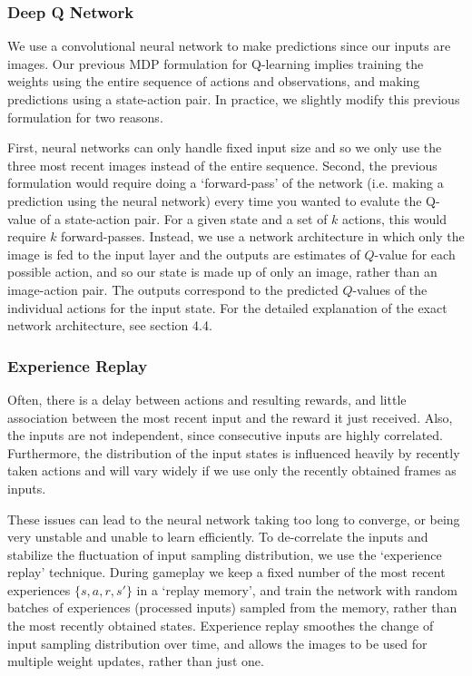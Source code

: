 \documentclass{article}
\begin{document}
\begin{multicols}{2}
\subsubsection{Deep Q Network}

We use a convolutional neural network to make predictions since our inputs are images. Our previous MDP formulation for Q-learning implies training the weights using the entire sequence of actions and observations, and making predictions using a state-action pair. In practice, we slightly modify this previous formulation for two reasons.

First, neural networks can only handle fixed input size and so we only use the three most recent images instead of the entire sequence.
Second, the previous formulation would require doing a `forward-pass' of the network (i.e. making a prediction using the neural network) every time you wanted to evalute the Q-value of a state-action pair. For a given state and a set of $k$ actions, this would require $k$ forward-passes.
Instead, we use a network architecture in which only the image is fed to the input layer and the outputs are estimates of $Q$-value for each possible action, and so our state is made up of only an image, rather than an image-action pair. The outputs correspond to the predicted $Q$-values of the individual actions for the input state. For the detailed explanation of the exact network architecture, see section 4.4.

\subsubsection{Experience Replay}

Often, there is a delay between actions and resulting rewards, and little association between the most recent input and the reward it just received. Also, the inputs are not independent, since consecutive inputs are highly correlated. Furthermore, the distribution of the input states is influenced heavily by recently taken actions and will vary widely if we use only the recently obtained frames as inputs.

These issues can lead to the neural network taking too long to converge, or being very unstable and unable to learn efficiently. To de-correlate the inputs and stabilize the fluctuation of input sampling distribution, we use the `experience replay' technique. During gameplay we keep a fixed number of the most recent experiences $\{s, a, r, s'\}$ in a `replay memory', and train the network with random batches of experiences (processed inputs) sampled from the memory, rather than the most recently obtained states. Experience replay smoothes the change of input sampling distribution over time, and allows the images to be used for multiple weight updates, rather than just one.


\end{multicols}
\end{document}
